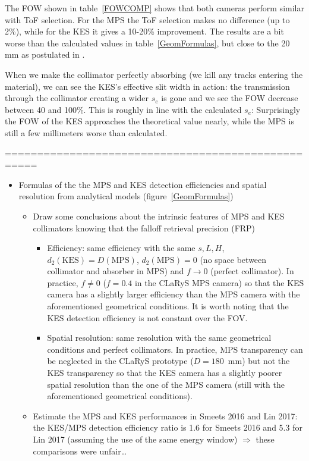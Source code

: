 \documentclass[a4paper,english]{article}
\begin{document}
The FOW shown in table~\ref{FOWCOMP} shows that both cameras perform similar with ToF selection. For the MPS the ToF selection makes no difference (up to 2\%), while for the KES it gives a 10-20\% improvement. The results are a bit worse than the calculated values in table~\ref{GeomFormulas}, but close to the 20 mm as postulated in \cite{Priegnitz2015}.

When we make the collimator perfectly absorbing (we kill any tracks entering the material), we can see the KES's effective slit width in action: the transmission through the collimator creating a wider $s_e$ is gone and we see the FOW decrease between 40 and 100\%. This is roughly in line with the calculated $s_e$:  Surprisingly the FOW of the KES approaches the theoretical value nearly, while the MPS is still a few millimeters worse than calculated.





===================================================

\begin{itemize}
  \item Formulas of the the MPS and KES detection efficiencies and spatial resolution from analytical models (figure~\ref{GeomFormulas})

  \begin{itemize}
    \item Draw some conclusions about the intrinsic features of MPS and KES collimators knowing that the falloff retrieval precision (FRP)   
    \begin{itemize}
      \item Efficiency: same efficiency with the same $s, L, H$, $d_2(\text{KES}) = D(\text{MPS})$, $d_2(\text{MPS})=0$ (no space between collimator and absorber in MPS) and $f\longrightarrow0$ (perfect collimator). In practice, $f\ne 0$ ($f=0.4$ in the CLaRyS MPS camera) so that the KES camera has a slightly larger efficiency than the MPS camera with the aforementioned geometrical conditions. It is worth noting that the KES detection efficiency is not constant over the FOV.
      \item Spatial resolution: same resolution with the same geometrical conditions and perfect collimators. In practice, MPS transparency can be neglected in the CLaRyS prototype ($D = 180$~mm) but not the KES transparency so that the KES camera has a slightly poorer spatial resolution than the one of the MPS camera (still with the aforementioned geometrical conditions).
    \end{itemize}       
    \item Estimate the MPS and KES performances in Smeets 2016 and Lin 2017: the KES/MPS detection efficiency ratio is 1.6 for Smeets 2016 and 5.3 for Lin 2017 (assuming the use of the same energy window) $\Rightarrow$ these comparisons were unfair\dots   
  \end{itemize}
\end{itemize}
\end{document}
